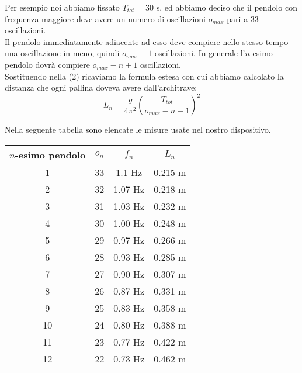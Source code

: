 \documentclass[a4paper]{article}
\begin{document}
Per esempio noi abbiamo fissato $T_{tot}=30$ s, ed abbiamo deciso che il pendolo con frequenza maggiore deve avere un numero di oscillazioni $o_{max}$ pari a 33 oscillazioni.\\
Il pendolo immediatamente adiacente ad esso deve compiere nello stesso tempo una oscillazione in meno, quindi $o_{max}-1$ oscillazioni. In generale l'$n$-esimo pendolo dovrà compiere $o_{max}-n+1$ oscillazioni.\\
Sostituendo nella (2) ricaviamo la formula estesa con cui abbiamo calcolato la distanza che ogni pallina doveva avere dall'architrave:
\begin{equation}
 	L_n=\frac{g}{4\pi^2}\left(\frac{T_{tot}}{o_{max}-n+1}\right)^2
\end{equation}

Nella seguente tabella sono elencate le misure usate nel nostro dispositivo.
\begin{center}
	\begin{tabular}{|c|c|c|c|}
	\hline
	$n$-esimo pendolo	&	 $o_n$ 	& $f_n$	& $L_n$\\
	\hline
	\hline
	1				& 33			& 1.1 Hz	&  0.215 m\\
	\hline
	2				& 32			& 1.07 Hz	&  0.218 m\\
	\hline
	3				& 31 			& 1.03 Hz	&  0.232 m\\
	\hline
	4				& 30	 		& 1.00 Hz	&  0.248 m\\
	\hline
	5				& 29			& 0.97 Hz	&  0.266 m\\
	\hline
	6				& 28	 		& 0.93 Hz	&  0.285 m\\
	\hline
	7				& 27	 		& 0.90 Hz	&  0.307 m\\
	\hline
	8				& 26	 		& 0.87 Hz	&  0.331 m\\
	\hline
	9				& 25	 		& 0.83 Hz	&  0.358 m\\
	\hline
	10				& 24			& 0.80 Hz	&  0.388 m \\
	\hline
	11				& 23	 		& 0.77 Hz	&  0.422 m \\
	\hline
	12				& 22	 		& 0.73 Hz	&  0.462 m \\
	\hline
	\end{tabular}
\end{center}
\end{document}

